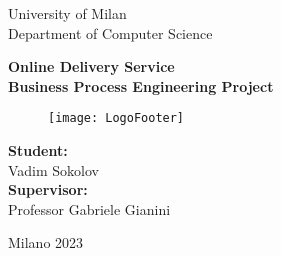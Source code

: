 \begin{center}
    University of Milan\\
    Department of Computer Science\\
\end{center}

\vspace{24mm}

\begin{center}%
    \large{\textbf{Online Delivery Service}}\\
    \textbf{Business Process Engineering Project}\\
\end{center}

\begin{figure}[ht!]
	\centering
	\texttt{[image: LogoFooter]}
	\label{fig:LogoFooter}
\end{figure}

\vspace{80mm}

\hspace{100mm}
\begin{minipage}{0.4\textwidth}
    \begin{flushleft}
        \textbf{Student:}\\Vadim Sokolov\\
        \vspace{4mm}
        \textbf{Supervisor:}\\Professor Gabriele Gianini\\
        \vspace{4mm}
    \end{flushleft}
\end{minipage}

\vspace*{\fill}

\begin{center}
    Milano 2023
\end{center}

\thispagestyle{empty}